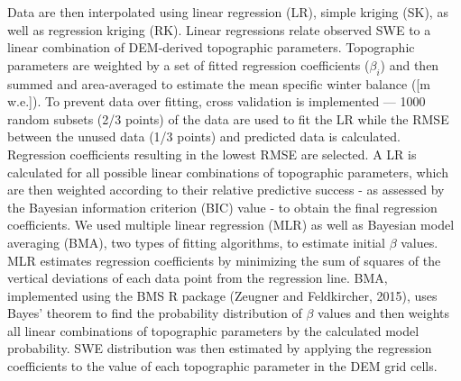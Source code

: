 \documentclass[twoside,twocolumn]{article}
\begin{document}
Data are then interpolated using linear regression (LR), simple kriging (SK), as well as regression kriging (RK). Linear regressions relate observed SWE to a linear combination of DEM-derived topographic parameters. Topographic parameters are weighted by a set of fitted regression coefficients ($\beta_i$) and then summed and area-averaged to estimate the mean specific winter balance ([m w.e.]). To prevent data over fitting, cross validation is implemented --- 1000 random subsets (2/3 points) of the data are used to fit the LR while the RMSE between the unused data (1/3 points) and predicted data is calculated. Regression coefficients resulting in the lowest RMSE are selected. A LR is calculated for all possible linear combinations of topographic parameters, which are then weighted according to their relative predictive success - as assessed by the Bayesian information criterion (BIC) value - to obtain the final regression coefficients. We used multiple linear regression (MLR) as well as Bayesian model averaging (BMA), two types of fitting algorithms, to estimate initial $\beta$ values. MLR estimates regression coefficients by minimizing the sum of squares of the vertical deviations of each data point from the regression line. BMA, implemented using the BMS R package (Zeugner and Feldkircher, 2015), uses Bayes' theorem to find the probability distribution of $\beta$ values and then weights all linear combinations of topographic parameters by the calculated model probability. SWE distribution was then estimated by applying the regression coefficients to the value of each topographic parameter in the DEM grid cells. 
\end{document}
